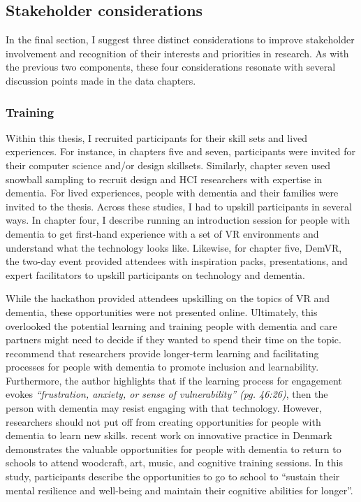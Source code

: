\subsection{Stakeholder considerations}
\label{StakeholderConsideration}
In the final section, I suggest three distinct considerations to improve stakeholder involvement and recognition of their interests and priorities in research. As with the previous two components, these four considerations resonate with several discussion points made in the data chapters.

\subsubsection{Training}
\label{Training}
Within this thesis, I recruited participants for their skill sets and lived experiences. For instance, in chapters five and seven, participants were invited for their computer science and/or design skillsets. Similarly, chapter seven used snowball sampling to recruit design and HCI researchers with expertise in dementia. For lived experiences, people with dementia and their families were invited to the thesis. Across these studies, I had to upskill participants in several ways. In chapter four, I describe running an introduction session for people with dementia to get first-hand experience with a set of VR environments and understand what the technology looks like. Likewise, for chapter five, DemVR, the two-day event provided attendees with inspiration packs, presentations, and expert facilitators to upskill participants on technology and dementia. 

While the hackathon provided attendees upskilling on the topics of VR and dementia, these opportunities were not presented online. Ultimately, this overlooked the potential learning and training people with dementia and care partners might need to decide if they wanted to spend their time on the topic. \cite{hwang2020exploring} recommend that researchers provide longer-term learning and facilitating processes for people with dementia to promote inclusion and learnability. Furthermore, the author highlights that if the learning process for engagement evokes \textit{``frustration, anxiety, or sense of vulnerability'' (pg. 46:26)}, then the person with dementia may resist engaging with that technology. However, researchers should not put off from creating opportunities for people with dementia to learn new skills. \cite{ward2020going}  recent work on innovative practice in Denmark demonstrates the valuable opportunities for people with dementia to return to schools to attend woodcraft, art, music, and cognitive training sessions. In this study, participants describe the opportunities to go to school to ``sustain their mental resilience and well-being and maintain their cognitive abilities for longer''.

